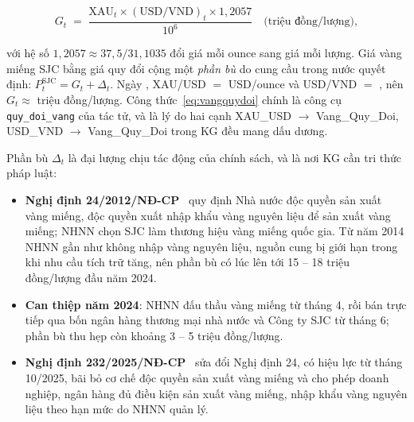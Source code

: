 \begin{equation}\label{eq:vangquydoi}
  G_t \;=\; \frac{\mathrm{XAU}_t \times (\mathrm{USD/VND})_t \times 1{,}2057}{10^6}
  \quad\text{(triệu đồng/lượng)},
\end{equation}

\noindent với hệ số $1{,}2057 \approx 37{,}5 / 31{,}1035$ đổi giá mỗi ounce sang giá mỗi lượng. Giá vàng miếng SJC
bằng giá quy đổi cộng một \emph{phần bù} do cung cầu trong nước quyết định:
$P^{\mathrm{SJC}}_t = G_t + \Delta_t$. Ngày , XAU/USD $=$ 
USD/ounce và USD/VND $=$ , nên $G_t \approx$  triệu
đồng/lượng. Công thức~\eqref{eq:vangquydoi} chính là công cụ \texttt{quy\_doi\_vang} của tác tử, và là lý do hai cạnh
\textsf{XAU\_USD} $\to$ \textsf{Vang\_Quy\_Doi}, \textsf{USD\_VND} $\to$ \textsf{Vang\_Quy\_Doi} trong KG đều mang
dấu dương.



Phần bù $\Delta_t$ là đại lượng chịu tác động của chính sách, và là nơi KG cần tri thức pháp luật:

\begin{itemize}
  \item \textbf{Nghị định 24/2012/NĐ-CP}~\cite{nd24_2012} quy định Nhà nước độc quyền sản xuất vàng miếng, độc quyền
        xuất nhập khẩu vàng nguyên liệu để sản xuất vàng miếng; NHNN chọn SJC làm thương hiệu vàng miếng quốc gia.
        Từ năm 2014 NHNN gần như không nhập vàng nguyên liệu, nguồn cung bị giới hạn trong khi nhu cầu tích trữ tăng,
        nên phần bù có lúc lên tới 15 -- 18 triệu đồng/lượng đầu năm 2024.
  \item \textbf{Can thiệp năm 2024}: NHNN đấu thầu vàng miếng từ tháng 4, rồi bán trực tiếp qua bốn ngân hàng thương
        mại nhà nước và Công ty SJC từ tháng 6; phần bù thu hẹp còn khoảng 3 -- 5 triệu đồng/lượng.
  \item \textbf{Nghị định 232/2025/NĐ-CP}~\cite{nd232_2025} sửa đổi Nghị định 24, có hiệu lực từ tháng 10/2025,
        bãi bỏ cơ chế độc quyền sản xuất vàng miếng và cho phép doanh nghiệp, ngân hàng đủ điều kiện sản xuất vàng
        miếng, nhập khẩu vàng nguyên liệu theo hạn mức do NHNN quản lý.
\end{itemize}

